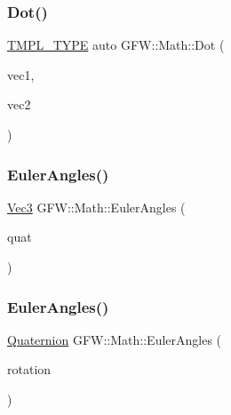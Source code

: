 \subsubsection{\texorpdfstring{Dot()}{Dot()}}
{\footnotesize\ttfamily \hyperlink{_math_8h_a2618808fbb8e74983f8aaea56d02752b}{T\+M\+P\+L\+\_\+\+T\+Y\+PE} auto G\+F\+W\+::\+Math\+::\+Dot (\begin{DoxyParamCaption}\item[{const type \&}]{vec1,  }\item[{const type \&}]{vec2 }\end{DoxyParamCaption})}

\mbox{\label{namespace_g_f_w_1_1_math_ae5b20e068bdf3e5a1eb24127012b76af}} 
\subsubsection{\texorpdfstring{Euler\+Angles()}{EulerAngles()}\hspace{0.1cm}{\footnotesize\ttfamily [1/2]}}
{\footnotesize\ttfamily \hyperlink{namespace_g_f_w_1_1_math_a3c3a254de27c8bbb8434611ce231c378}{Vec3} G\+F\+W\+::\+Math\+::\+Euler\+Angles (\begin{DoxyParamCaption}\item[{const \hyperlink{namespace_g_f_w_1_1_math_ae0c2a9f7efcd94286b950a2ddea66ee0}{Quaternion} \&}]{quat }\end{DoxyParamCaption})\hspace{0.3cm}{\ttfamily [inline]}}

\mbox{\label{namespace_g_f_w_1_1_math_ad511965c738b842759490b4b67ab1f36}} 
\subsubsection{\texorpdfstring{Euler\+Angles()}{EulerAngles()}\hspace{0.1cm}{\footnotesize\ttfamily [2/2]}}
{\footnotesize\ttfamily \hyperlink{namespace_g_f_w_1_1_math_ae0c2a9f7efcd94286b950a2ddea66ee0}{Quaternion} G\+F\+W\+::\+Math\+::\+Euler\+Angles (\begin{DoxyParamCaption}\item[{const \hyperlink{namespace_g_f_w_1_1_math_a3c3a254de27c8bbb8434611ce231c378}{Vec3} \&}]{rotation }\end{DoxyParamCaption})\hspace{0.3cm}{\ttfamily [inline]}}


